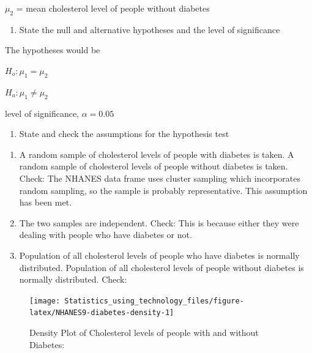 \documentclass[
]{book}
\newenvironment{Shaded}{\begin{snugshade}}{\end{snugshade}}
\newcommand{\DataTypeTok}[1]{\textcolor[rgb]{0.13,0.29,0.53}{#1}}
\newcommand{\KeywordTok}[1]{\textcolor[rgb]{0.13,0.29,0.53}{\textbf{#1}}}
\newcommand{\NormalTok}[1]{#1}
\newcommand{\OperatorTok}[1]{\textcolor[rgb]{0.81,0.36,0.00}{\textbf{#1}}}
\newcommand{\StringTok}[1]{\textcolor[rgb]{0.31,0.60,0.02}{#1}}
\providecommand{\tightlist}{%
  \setlength{\itemsep}{0pt}\setlength{\parskip}{0pt}}
\begin{document}
\(\mu_2\) = mean cholesterol level of people without diabetes

\begin{enumerate}
\def\labelenumi{\arabic{enumi}.}
\setcounter{enumi}{1}
\tightlist
\item
  State the null and alternative hypotheses and the level of significance
\end{enumerate}

The hypotheses would be

\(H_o: \mu_1=\mu_2\)

\(H_a: \mu_1 \ne \mu_2\)

level of significance, \(\alpha=0.05\)

\begin{enumerate}
\def\labelenumi{\arabic{enumi}.}
\setcounter{enumi}{2}
\tightlist
\item
  State and check the assumptions for the hypothesis test
\end{enumerate}

\begin{enumerate}
\def\labelenumi{\alph{enumi}.}
\item
  A random sample of cholesterol levels of people with diabetes is taken. A random sample of cholesterol levels of people without diabetes is taken. Check: The NHANES data frame uses cluster sampling which incorporates random sampling, so the sample is probably representative. This assumption has been met.
\item
  The two samples are independent. Check: This is because either they were dealing with people who have diabetes or not.
\item
  Population of all cholesterol levels of people who have diabetes is normally distributed. Population of all cholesterol levels of people without diabetes is normally distributed.
  Check:
\end{enumerate}



\begin{Shaded}
\end{Shaded}

\begin{figure}
\texttt{[image: Statistics\_using\_technology\_files/figure-latex/NHANES9-diabetes-density-1]} \caption{Density Plot of Cholesterol levels of people with and without Diabetes:}\label{fig:NHANES9-diabetes-density}
\end{figure}
\end{document}
